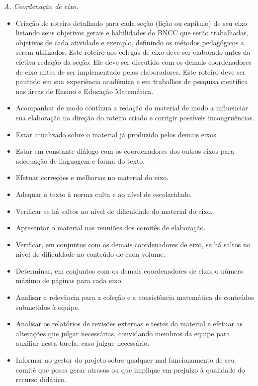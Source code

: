 \documentclass[10 pt]{article}
\begin{document}
{\it A. Coordenação de eixo.}
\begin{itemize} %
  \item     Criação de roteiro detalhado para cada seção (lição ou capítulo) de seu eixo listando seus objetivos gerais e habilidades do BNCC que serão trabalhadas, objetivos de cada atividade e exemplo, definindo os métodos pedagógicos a serem utilizados. Este roteiro aos colegas de eixo deve ser elaborado antes da efetiva redação da seção. Ele deve ser discutido com os demais coordenadores de eixo antes de ser implementado pelos elaboradores. Este roteiro deve ser pautado em sua experiência acadêmica e em trabalhos de pesquisa científica nas áreas de Ensino e Educação Matemática.
  \item     Acompanhar de modo contínuo a redação do material de modo a influenciar sua elaboração na direção do roteiro criado e corrigir possíveis incongruências.
  \item     Estar atualizado sobre o material já produzido pelos demais eixos.
  \item     Estar em constante diálogo com os coordenadores dos outros eixos para adequação de linguagem e forma do texto.
  \item     Efetuar correções e melhorias no material do eixo.
  \item     Adequar o texto à norma culta e ao nível de escolaridade.
  \item     Verificar se há saltos no nível de dificuldade do material do eixo.
  \item     Apresentar o material nas reuniões dos comitês de elaboração.
  \item     Verificar, em conjuntos com os demais coordenadores de eixo, se há saltos no nível de dificuldade no conteúdo de cada volume.
  \item     Determinar, em conjuntos com os demais coordenadores de eixo, o número máximo de páginas para cada eixo.
  \item     Analisar a relevância para a coleção e a consistência matemática de conteúdos submetidos à equipe.
  \item     Analisar os relatórios de revisões externas e testes do material e efetuar as alterações que julgar necessárias, convidando membros da equipe para auxiliar nesta tarefa, caso julgue necessário.
  \item     Informar ao gestor do projeto sobre qualquer mal funcionamento de seu comitê que possa gerar atrasos ou que implique em prejuízo à qualidade do recurso didático.
\end{itemize} %
\vspace{0.2cm}
\end{document}
